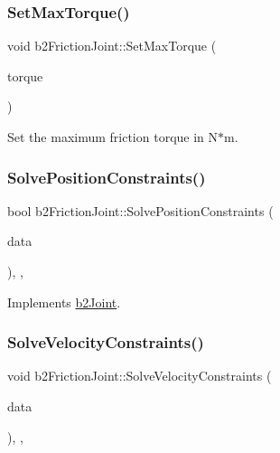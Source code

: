 \subsubsection{\texorpdfstring{SetMaxTorque()}{SetMaxTorque()}}
{\footnotesize\ttfamily void b2\+Friction\+Joint\+::\+Set\+Max\+Torque (\begin{DoxyParamCaption}\item[{\mbox{\hyperlink{b2_settings_8h_aacdc525d6f7bddb3ae95d5c311bd06a1}{float32}}}]{torque }\end{DoxyParamCaption})}



Set the maximum friction torque in N$\ast$m. 

\mbox{\label{classb2_friction_joint_a4e4b64b634299136bc2c7096d5c28aa8}} 
\subsubsection{\texorpdfstring{SolvePositionConstraints()}{SolvePositionConstraints()}}
{\footnotesize\ttfamily bool b2\+Friction\+Joint\+::\+Solve\+Position\+Constraints (\begin{DoxyParamCaption}\item[{const \mbox{\hyperlink{structb2_solver_data}{b2\+Solver\+Data}} \&}]{data }\end{DoxyParamCaption})\hspace{0.3cm}{\ttfamily [override]}, {\ttfamily [protected]}, {\ttfamily [virtual]}}



Implements \mbox{\hyperlink{classb2_joint_af767ac9aa494bd15cdf83dfe3e487d9c}{b2\+Joint}}.

\mbox{\label{classb2_friction_joint_a49109c1785d949e99a809a8c297abf13}} 
\subsubsection{\texorpdfstring{SolveVelocityConstraints()}{SolveVelocityConstraints()}}
{\footnotesize\ttfamily void b2\+Friction\+Joint\+::\+Solve\+Velocity\+Constraints (\begin{DoxyParamCaption}\item[{const \mbox{\hyperlink{structb2_solver_data}{b2\+Solver\+Data}} \&}]{data }\end{DoxyParamCaption})\hspace{0.3cm}{\ttfamily [override]}, {\ttfamily [protected]}, {\ttfamily [virtual]}}




